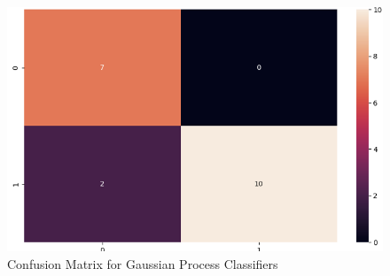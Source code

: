 \begin{figure}
    \centering
    \includegraphics[width=0.5\linewidth]{Figures/Screenshot 2025-07-16 at 2.28.53 PM.png}
    \caption{Confusion Matrix for Gaussian Process Classifiers}
    \label{fig:cm2}
\end{figure}
